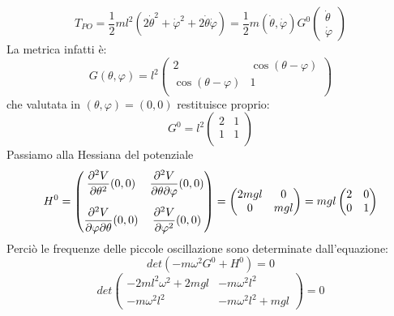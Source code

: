 \documentclass[a4paper,openany]{article}
\begin{document}
	\begin{equation}
		T_{PO} = \dfrac{1}{2}ml^2 (2\dot{\theta}^2+ \dot{\varphi}^2 + 2\dot{\theta}\dot{\varphi}) =  \dfrac{1}{2}m(\dot{\theta},\dot{\varphi})G^{0}
		\begin{pmatrix}
			\dot{\theta} \\
			\dot{\varphi}
		\end{pmatrix}
	\end{equation}
	La metrica infatti è:
	\begin{equation}
		G(\theta,\varphi) = l^2
		\begin{pmatrix}
			2 & \cos(\theta-\varphi) \\
			\cos(\theta-\varphi) & 1 \\
		\end{pmatrix}
	\end{equation}
	che valutata in $(\theta,\varphi)=(0,0)$ restituisce proprio:
	\begin{equation}
		G^0 = l^2
		\begin{pmatrix}
			2 & 1 \\
			1 & 1 \\
		\end{pmatrix}
	\end{equation}
	Passiamo alla Hessiana del potenziale
	\begin{equation}\label{key}
		H^0 =
		\begin{pmatrix}
			\dfrac{\partial ^2 V}{\partial \theta^2}(0,0) & \dfrac{\partial ^2 V}{\partial \theta\partial \varphi}(0,0)
			\vspace{3mm} \\ 
			\dfrac{\partial ^2 V}{\partial \varphi\partial \theta}(0,0) & 	\dfrac{\partial ^2 V}{\partial \varphi^2}(0,0)
		\end{pmatrix} = 
		\begin{pmatrix}
			2mgl & 0 \\
			0 & mgl \\
		\end{pmatrix} = 
		mgl
		\begin{pmatrix}
			2 & 0 \\
			0 & 1 \\
		\end{pmatrix}
	\end{equation}
	Perciò le frequenze delle piccole oscillazione sono determinate dall'equazione:
	$$
	det(-m\omega^{2}G^0+H^0) = 0
	$$
	$$
	det
	\begin{pmatrix}
		-2ml^2\omega^2 + 2mgl & -m\omega^{2}l^2 \\
		-m\omega^{2}l^{2} & -m\omega^{2}l^2+mgl
	\end{pmatrix} = 0
	$$
\end{document}
